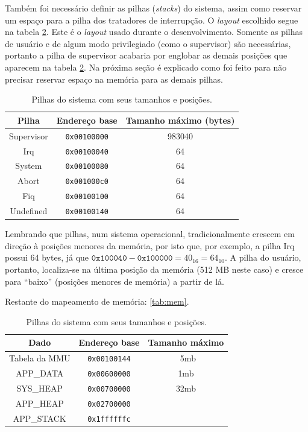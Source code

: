 \documentclass{ufscThesis/ufscThesis} %
\begin{document}
Também foi necessário definir as pilhas (\emph{stacks}) do sistema, assim como reservar um espaço para a pilha dos tratadores de interrupção. O \emph{layout} escolhido segue na tabela \ref{tab:stacks}.
Este é o \emph{layout} usado durante o desenvolvimento. Somente as pilhas de usuário e de algum modo privilegiado (como o supervisor) são necessárias, portanto a pilha de supervisor acabaria por englobar as demais posições que aparecem na tabela \ref{tab:stacks}. Na próxima seção é explicado como foi feito para não precisar reservar espaço na memória para as demais pilhas.

\begin{table}[hb]
	\centering
	\begin{tabular}{ccc}
		\hline \hline
		Pilha & Endereço base & Tamanho máximo (bytes)\\[0.5ex]
		\hline
		Supervisor		& \verb+0x00100000+ & 983040\\
		Irq			& \verb+0x00100040+ & 64\\
		System			& \verb+0x00100080+ & 64\\
		Abort			& \verb+0x001000c0+ & 64\\
		Fiq			& \verb+0x00100100+ & 64\\
		Undefined		& \verb+0x00100140+ & 64\\[1ex]
		\hline
	\end{tabular}
	\caption{Pilhas do sistema com seus tamanhos e posições.}
	\label{tab:stacks}
\end{table}

Lembrando que pilhas, num sistema operacional, tradicionalmente crescem em direção à posições menores da memória, por isto que, por exemplo, a pilha Irq possui 64 bytes, já que $\texttt{0x100040}-\texttt{0x100000} = 40_{16} = 64_{10}$. A pilha do usuário, portanto, localiza-se na última posição da memória (512 MB neste caso) e cresce para ``baixo'' (posições menores de memória) a partir de lá.



Restante do mapeamento de memória:
\ref{tab:mem}.
\begin{table}[hb]
	\centering
	\begin{tabular}{ccc}
		\hline \hline
		Dado & Endereço base & Tamanho máximo\\[0.5ex]
		\hline
		Tabela da MMU		& \verb+0x00100144+ & ~5mb\\
		APP\_DATA		& \verb+0x00600000+ & 1mb\\
		SYS\_HEAP		& \verb+0x00700000+ & 32mb\\
		APP\_HEAP		& \verb+0x02700000+ & \\
		APP\_STACK		& \verb+0x1ffffffc+ & \\[1ex]
		\hline
	\end{tabular}
	\caption{Pilhas do sistema com seus tamanhos e posições.}
	\label{tab:stacks}
\end{table}
\end{document}
